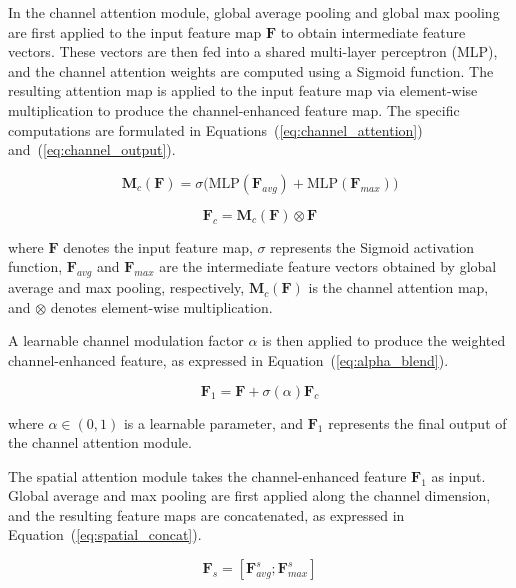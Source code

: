 \documentclass[sn-basic]{sn-jnl}
\theoremstyle{thmstyleone}%
\theoremstyle{thmstyletwo}%
\theoremstyle{thmstylethree}%
\begin{document}
In the channel attention module, global average pooling and global max pooling are first applied to the input feature map $\mathbf{F}$ to obtain intermediate feature vectors. These vectors are then fed into a shared multi-layer perceptron (MLP), and the channel attention weights are computed using a Sigmoid function. The resulting attention map is applied to the input feature map via element-wise multiplication to produce the channel-enhanced feature map. %
The specific computations are formulated in Equations~(\ref{eq:channel_attention}) and~(\ref{eq:channel_output}).

\begin{equation}
\mathbf{M}_c(\mathbf{F}) = \sigma\big(\text{MLP}(\mathbf{F}_{avg}) + \text{MLP}(\mathbf{F}_{max})\big)
\label{eq:channel_attention}
\end{equation}

\begin{equation}
\mathbf{F}_c = \mathbf{M}_c(\mathbf{F}) \otimes \mathbf{F}
\label{eq:channel_output}
\end{equation}

where $\mathbf{F}$ denotes the input feature map, $\sigma$ represents the Sigmoid activation function, $\mathbf{F}_{avg}$ and $\mathbf{F}_{max}$ are the intermediate feature vectors obtained by global average and max pooling, respectively, $\mathbf{M}_c(\mathbf{F})$ is the channel attention map, and $\otimes$ denotes element-wise multiplication.  

A learnable channel modulation factor $\alpha$ is then applied to produce the weighted channel-enhanced feature, as expressed in Equation~(\ref{eq:alpha_blend}).

\begin{equation}
\mathbf{F}_1 = \mathbf{F} + \sigma(\alpha) \mathbf{F}_c
\label{eq:alpha_blend}
\end{equation}

where $\alpha \in (0,1)$ is a learnable parameter, and $\mathbf{F}_1$ represents the final output of the channel attention module.  

The spatial attention module takes the channel-enhanced feature $\mathbf{F}_1$ as input. Global average and max pooling are first applied along the channel dimension, and the resulting feature maps are concatenated, as expressed in Equation~(\ref{eq:spatial_concat}).

\begin{equation}
\mathbf{F}_s = [\mathbf{F}_{avg}^s; \mathbf{F}_{max}^s]
\label{eq:spatial_concat}
\end{equation}
\end{document}
